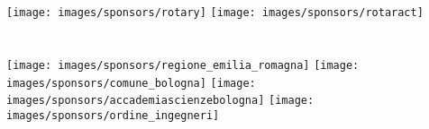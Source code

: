\begin{center}
\begin{multicols}{4}
\texttt{[image: images/sponsors/rotary]}
\texttt{[image: images/sponsors/rotaract]} 
\end{multicols}

\section*{\color{siamblue}{UNDER THE PATRONAGE OF}}
\vspace{0.1cm}

\begin{multicols}{4}
\texttt{[image: images/sponsors/regione\_emilia\_romagna]}
\texttt{[image: images/sponsors/comune\_bologna]}
\texttt{[image: images/sponsors/accademiascienzebologna]}
\texttt{[image: images/sponsors/ordine\_ingegneri]}
\end{multicols}

\end{center}
\setlength{\columnseprule}{0.5pt}


